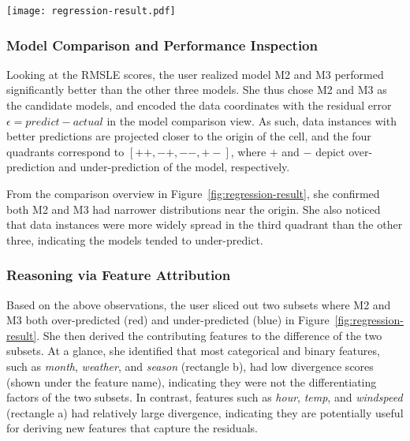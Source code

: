 \documentclass[preprint,journal]{vgtc}       %
\begin{document}
\begin{figure*}[t]
 \centering
 \texttt{[image: regression-result.pdf]}
 \caption{Left: Model performance comparison between model pairs for the bike sharing regression problem. Two instance subsets where both top two performing models (M2 \& M3) generated over-predicted (pink) and under-predicted (blue) values were selected for further study. Right: the contributing features sorted by the divergence between the value distributions of the two instance subsets.}
 \label{fig:regression-result}
\end{figure*}

\subsubsection{Model Comparison and Performance Inspection}
Looking at the RMSLE scores, the user realized model M2 and M3 performed significantly better than the other three models. She thus chose M2 and M3 as the candidate models, and encoded the data coordinates with the residual error $\epsilon = predict - actual$ in the model comparison view. As such, data instances with better predictions are projected closer to the origin of the cell, and the four quadrants correspond to $[++, -+, --, +-]$, where $+$ and $-$ depict over-prediction and under-prediction of the model, respectively.

From the comparison overview in Figure~\ref{fig:regression-result}, she confirmed both M2 and M3 had narrower distributions near the origin. She also noticed that data instances were more widely spread in the third quadrant than the other three, indicating the models tended to under-predict.

\subsubsection{Reasoning via Feature Attribution}
Based on the above observations, the user sliced out two subsets where M2 and M3 both over-predicted (red) and under-predicted (blue) in Figure~\ref{fig:regression-result}. She then derived the contributing features to the difference of the two subsets. At a glance, she identified that most categorical and binary features, such as \textit{month}, \textit{weather}, and \textit{season} (rectangle b), had low divergence scores (shown under the feature name), indicating they were not the differentiating factors of the two subsets. In contrast, features such as \textit{hour}, \textit{temp}, and \textit{windspeed} (rectangle a) had relatively large divergence, indicating they are potentially useful for deriving new features that capture the residuals.
\end{document}
